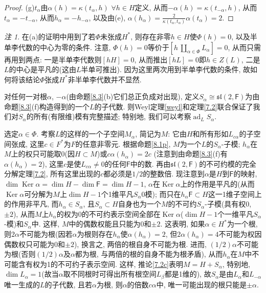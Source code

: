 \documentclass{ctexart}%
\theoremstyle{definition}
\theoremstyle{remark}
\newtheorem{remark}{注}
\DeclareMathOperator{\ad}{ad}
\DeclareMathOperator{\Ker}{Ker}
\begin{document}
\begin{proof}
(g)$t_\alpha$由$\alpha(h)=\kappa(t_\alpha,h)$ $\forall h\in H$定义, 从而$-\alpha(h)=\kappa(t_{-\alpha},h)$, 从而$t_\alpha=-t_{-\alpha}$, 从而$h_\alpha=-h_{-\alpha}$, 以及由(e), $\alpha(h_\alpha)=\frac{2}{\kappa(t_\alpha,t_\alpha)}\alpha(t_\alpha)=2$. 
\end{proof}

\begin{remark}
在(a)的证明中用到了若$\Phi$未张成$H^*$, 则存在非零$h\in H$使$\Phi(h)=0$, 以及半单李代数的中心为零的条件. 注意, $\Phi(h)=0$等价于$[h\,\coprod_{\alpha\in\Phi}L_\alpha]=0$, 从而只需再用到两点: 一是半单李代数则$[hH]=0$, 从而推出$[hL]=0$即$h\in Z(L)$, 二是$L$的中心是平凡的(这由$L$半单可推出). 因为这里两次用到半单李代数的条件, 故如何将该结论$\Phi$张成$H^*$非半单李代数并不显然.
\end{remark}


对任何一对根$\alpha$, $-\alpha$(由命题\ref{8.3}(b)它们总正负成对出现), 定义$S_\alpha\cong \mathfrak{sl}(2,\mathsf{F})$为由命题\ref{8.3}(f)构造得到的一个$L$的子代数. 则Weyl定理\ref{weyl}和定理\ref{7.2}联合保证了我们对$S_\alpha$的所有(有限维)模有完整描述; 特别地, 我们可以考察$\ad_L S_\alpha$. 

选定$\alpha \in \Phi$. 考察$L$的这样的一个子空间$M_\alpha$, 简记为$M$: 它由$H$和所有形如$L_{c\alpha}$的子空间张成, 这里$c\in F^*$为$F$的任意非零元. 根据命题\ref{8.1p}, $M$为一个$L$的$S_\alpha$-子模; $h_\alpha$在$M$上的权只可能取$0$(因$H\subset M$)或$c\alpha(h_\alpha)=2c$ (注意到由命题\ref{8.3}(f)有$\alpha(h_\alpha)=2$), 这里$c$是使$L_{c\alpha}\neq 0$的任何$\mathsf{F}$中的数. 再由$\mathfrak{sl}(2,\mathsf{F})$的不可约模的完全分解定理\ref{7.2}, 所有这里出现的$c$都必须是$1/2$的整数倍. 现注意到$\alpha$是$H$到$\mathsf{F}$的映射, $\dim \Ker \alpha = \dim H - \dim \mathsf{F} = \dim H -1$, $\alpha$在$\Ker \alpha$上的作用是平凡的(从而$\Ker \alpha$可分解为$M$上$\dim H - 1$个1维平凡$S_\alpha$0模); 而只在$h_\alpha \mathsf{F}\subset H$这一1维子空间上的作用非平凡, 而$h_\alpha \in S_\alpha$, 且$S_\alpha\subset H$自身也为一个$M$的不可约$S_\alpha$-子模(具有权$0$, $\pm 2$), 从而$M$上$h_\alpha$的权为0的不可约表示空间全部在$\Ker \alpha$($\dim H -1$个一维平凡$S_\alpha$-模)和$S_\alpha$中. 这样, $M$中的偶数权能且只能为$0$和$\pm 2$. 这表明, 如果$\alpha \in H^*$为一个根, 则$2\alpha$不可能为根(因若$\alpha$为根则存在$h_\alpha$使$\alpha(h_\alpha)=2$, 但$2\alpha(h_\alpha)=4$不可能为权因偶数权只可能为$0$和$\pm 2$), 换言之, 两倍的根自身不可能为根. 进而, $(1/2)\alpha$不可能为根(否则$(1/2)\alpha$及$\alpha$都为根, 与两倍的根的自身不能为根矛盾), 从而$h_\alpha$在$M$中不可能含有权为1的不可约子表示空间. 这样, 推论\ref{7.2c}表明$M=H+S_\alpha$, 特别地, $\dim L_\alpha = 1$(故当$\alpha$取不同根时可得出所有根空间$L_\beta$都是1维的), 故$S_\alpha$是由$L_\alpha$和$L_{-\alpha}$唯一生成的$L$的子代数, 且若$\alpha$为根, 则$\alpha$的倍数$c\alpha$中, 唯一可能出现的根只能是$\pm \alpha$.
\end{document}

